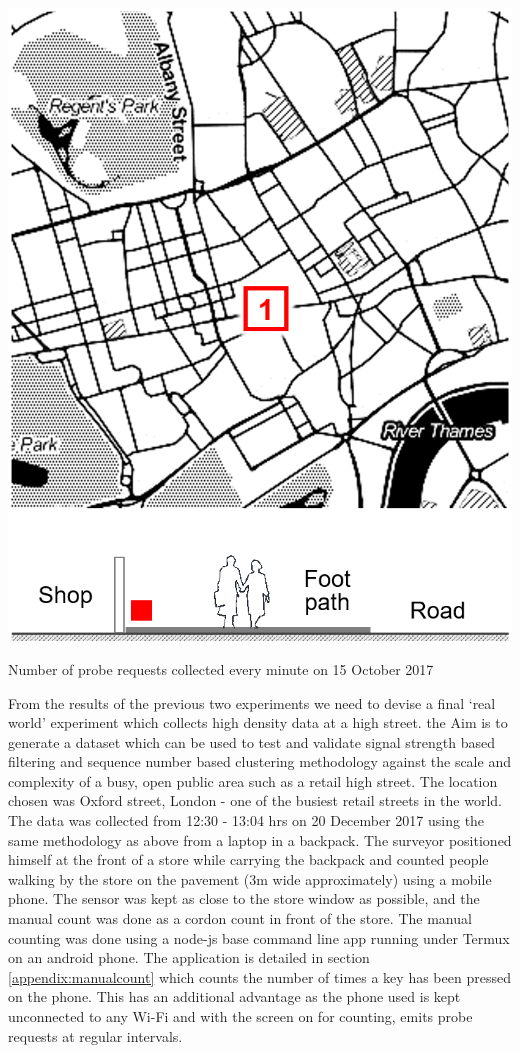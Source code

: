 \begin{marginfigure}
  \includegraphics[trim={0 0 0 0},clip]{images/oxst-map.png}
  \caption{Number of probe requests collected every minute on 15 October 2017}
  \label{figure:collection:ucl:config}
\end{marginfigure}

From the results of the previous two experiments we need to devise a final `real world' experiment which collects high density data at a high street.
the Aim is to generate a dataset which can be used to test and validate signal strength based filtering and sequence number based clustering methodology against the scale and complexity of a busy, open public area such as a retail high street.
The location chosen was Oxford street, London - one of the busiest retail streets in the world.
The data was collected from 12:30 - 13:04 hrs on 20 December 2017 using the same methodology as above from a laptop in a backpack.
The surveyor positioned himself at the front of a store while carrying the backpack and counted people walking by the store on the pavement (3m wide approximately) using a mobile phone.
The sensor was kept as close to the store window as possible, and the manual count was done as a cordon count in front of the store.
The manual counting was done using a node-js base command line app running under Termux on an android phone.
The application is detailed in section \ref{appendix:manualcount} which counts the number of times a key has been pressed on the phone.
This has an additional advantage as the phone used is kept unconnected to any Wi-Fi and with the screen on for counting, emits probe requests at regular intervals.

